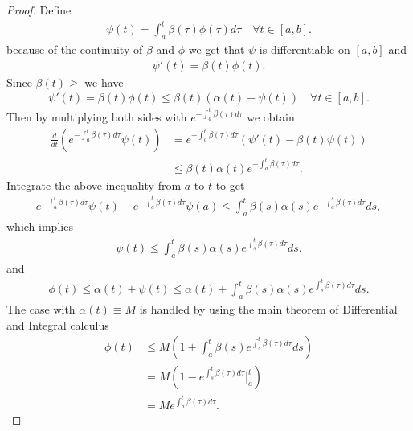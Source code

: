 \begin{proof}
 Define 
 \begin{align*}
   \psi   (t) = \int_a^{t} \beta(\tau ) \phi(\tau ) d\tau  \quad \forall t \in [a,b]
 .\end{align*}
 because of the continuity of $\beta $ and $\phi $ we get that $\psi $ is differentiable on $[a,b]$ and
 \begin{align*}
  \psi'(t) = \beta(t)\phi(t)
 .\end{align*}
 Since $\beta(t) \ge $ we have 
 \begin{align*}
   \psi'(t) = \beta(t) \phi(t) \le \beta(t) (\alpha(t)+\psi(t)) \quad \forall t \in [a,b]
 .\end{align*}
 Then by multiplying both sides with $e^{-\int_a^{t} \beta(\tau ) d\tau  } $ we obtain 
 \begin{align*}
   \frac{d}{dt} (e^{-\int_a^{t} \beta(\tau ) d\tau  }\psi(t) ) &= e^{-\int_a^{t} \beta(\tau ) d\tau  }(\psi'(t) - \beta(t)\psi(t))\\
                                                               &\le \beta(t)\alpha(t)e^{-\int_a^{t} \beta(\tau ) d\tau  }
 .\end{align*}
 Integrate the above inequality from  $a$ to $t$ to get 
 \begin{align*}
  e^{-\int_a^{t} \beta(\tau ) d\tau  }\psi(t) - e^{-\int_a^{t} \beta(\tau ) d\tau  }\psi (a) \le \int_a^{t} \beta(s)\alpha(s) e^{-\int_a^{s} \beta(\tau ) d\tau  }  ds
 ,\end{align*}
 which implies 
 \begin{align*}
  \psi(t) \le \int_a^{t} \beta(s)\alpha(s)  e^{\int_s^{t} \beta(\tau ) d\tau  } ds
 .\end{align*}
 and 
 \begin{align*}
  \phi(t) \le \alpha(t) + \psi(t) \le  \alpha(t) + \int_a^{t} \beta(s) \alpha(s)e^{\int_s^{t} \beta(\tau ) d\tau  }  ds
 .\end{align*}
 The case with $\alpha(t) \equiv M$ is handled by using the main theorem of Differential and Integral calculus 
 \begin{align*}
   \phi(t) &\le  M \left( 1+\int_a^{t} \beta(s) e^{\int_s^{t}\beta(\tau )d\tau  } ds   \right) \\
           &= M(1-e^{\int_s^{t} \beta(\tau ) d\tau  }\rvert_a^{t}  ) \\
           &= Me^{\int_a^{t}\beta(\tau ) d\tau  } 
 .\end{align*}
\end{proof}

